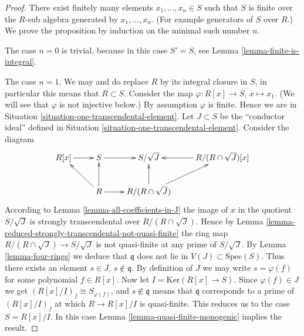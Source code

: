 \begin{proof}
There exist finitely many elements
$x_1,\ldots, x_n \in S$ such that $S$ is finite
over the $R$-sub algebra generated by $x_1,\ldots,x_n$. (For
example generators of $S$ over $R$.) We prove the proposition
by induction on the minimal such number $n$.

\medskip\noindent
The case $n = 0$ is trivial, because in this case $S' = S$,
see Lemma \ref{lemma-finite-is-integral}.

\medskip\noindent
The case $n = 1$. We may and do replace $R$ by its integral
closure in $S$, in particular this means that $R \subset S$.
Consider the map $\varphi : R[x] \to S$, $x \mapsto x_1$.
(We will see that $\varphi$ is not injective below.)
By assumption $\varphi$ is finite. Hence we are in Situation
\ref{situation-one-transcendental-element}.
Let $J \subset S$ be the ``conductor ideal'' defined
in Situation \ref{situation-one-transcendental-element}.
Consider the diagram
$$
\xymatrix{
R[x] \ar[r] & S \ar[r] & S/\sqrt{J} & R/(R \cap \sqrt{J})[x] \ar[l]
\\
& R \ar[lu] \ar[r] \ar[u] & R/(R \cap \sqrt{J}) \ar[u] \ar[ru] &
}
$$
According to Lemma \ref{lemma-all-coefficients-in-J} 
the image of $x$ in the quotient $S/\sqrt{J}$
is strongly transcendental over $R/ (R \cap \sqrt{J})$.
Hence by Lemma \ref{lemma-reduced-strongly-transcendental-not-quasi-finite}
the ring map $R/ (R \cap \sqrt{J}) \to S/\sqrt{J}$
is not quasi-finite at any prime of $S/\sqrt{J}$.
By Lemma \ref{lemma-four-rings} we deduce that $\mathfrak q$
does not lie in $V(J) \subset \text{Spec}(S)$.
Thus there exists an element $s \in J$,
$s \not\in \mathfrak q$. By definition of $J$ we may write
$s = \varphi(f)$ for some polynomial $f \in R[x]$.
Now let $I = \text{Ker}(R[x] \to S)$. Since $\varphi(f) \in J$
we get $(R[x]/I)_f \cong S_{\varphi(f)}$, and $s \not \in \mathfrak q$
means that $\mathfrak q$ corresponds to a prime of $(R[x]/I)_f$
at which $R \to R[x]/I$ is quasi-finite. This reduces us
to the case $S = R[x]/I$. In this case
Lemma \ref{lemma-quasi-finite-monogenic} implies the result.


\end{proof}
